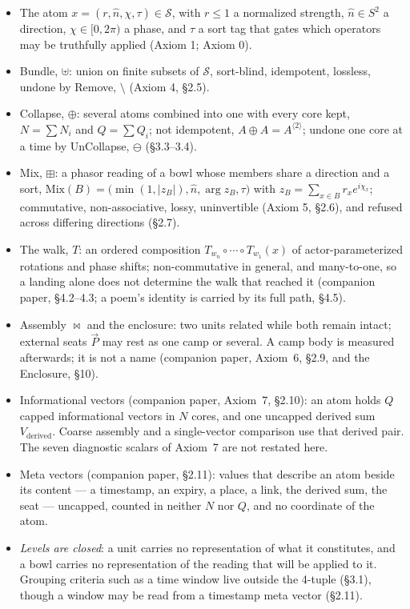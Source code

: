 \documentclass[12pt, a4paper]{article}
\begin{document}
\begin{itemize}
\item The atom $x=(r,\hat n,\chi,\tau)\in\mathcal{S}$, with $r\le 1$ a
      normalized strength, $\hat n\in S^2$ a direction, $\chi\in[0,2\pi)$
      a phase, and $\tau$ a sort tag that gates which operators may be
      truthfully applied (Axiom 1; Axiom 0).
\item Bundle, $\uplus$: union on finite subsets of $\mathcal{S}$,
      sort-blind, idempotent, lossless, undone by Remove, $\setminus$
      (Axiom 4, \S2.5).
\item Collapse, $\oplus$: several atoms combined into one with every
      core kept, $N=\sum N_i$ and $Q=\sum Q_i$; not idempotent,
      $A\oplus A=A^{\langle 2\rangle}$; undone one core at a time by
      UnCollapse, $\ominus$ (\S3.3--3.4).
\item Mix, $\boxplus$: a phasor reading of a bowl whose members share a
      direction and a sort,
      $\mathrm{Mix}(B)=\bigl(\min(1,|z_B|),\hat n,\arg z_B,\tau\bigr)$
      with $z_B=\sum_{x\in B} r_x e^{i\chi_x}$; commutative,
      non-associative, lossy, uninvertible (Axiom 5, \S2.6), and refused across differing directions (\S2.7).
\item The walk, $T$: an ordered composition
      $T_{w_n}\circ\cdots\circ T_{w_1}(x)$ of actor-parameterized
      rotations and phase shifts; non-commutative in general, and
      many-to-one, so a landing alone does not determine the walk that
      reached it (companion paper, \S4.2--4.3; a poem's identity is carried by its full path, \S4.5).
\item Assembly $\bowtie$ and the enclosure: two units related while
      both remain intact; external seats $\vec P$ may rest as one
      camp or several. A camp body is measured afterwards; it is not
      a name (companion paper, Axiom~6, \S2.9, and the Enclosure, \S10).
\item Informational vectors (companion paper, Axiom~7, \S2.10): an
      atom holds $Q$ capped informational vectors in $N$ cores, and one
      uncapped derived sum $V_{\mathrm{derived}}$. Coarse assembly and
      a single-vector comparison use that derived pair. The seven
      diagnostic scalars of Axiom~7 are not restated here.
\item Meta vectors (companion paper, \S2.11): values that describe an
      atom beside its content --- a timestamp, an expiry, a place, a
      link, the derived sum, the seat --- uncapped, counted in neither
      $N$ nor $Q$, and no coordinate of the atom.
\item \emph{Levels are closed}: a unit carries no representation of
      what it constitutes, and a bowl carries no representation of the
      reading that will be applied to it. Grouping criteria such as a time window live outside the 4-tuple (\S3.1), though a window may be read
      from a timestamp meta vector (\S2.11).
\end{itemize}
\end{document}
